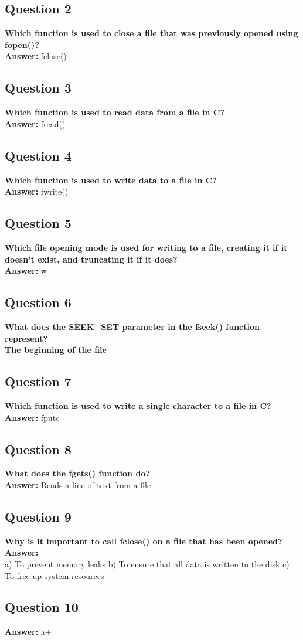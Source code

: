 \documentclass[11pt,parskip]{scrartcl}
\begin{document}
\subsection*{Question 2}
\textbf{Which function is used to close a file that was previously opened using fopen()?} \\
\textbf{Answer:} fclose()

\subsection*{Question 3}
\textbf{Which function is used to read data from a file in C?} \\
\textbf{Answer:} fread()

\subsection*{Question 4}
\textbf{Which function is used to write data to a file in C?} \\
\textbf{Answer:} fwrite()

\subsection*{Question 5}
\textbf{Which file opening mode is used for writing to a file, creating it if it doesn't exist, and truncating it if it does?} \\
\textbf{Answer:} w

\subsection*{Question 6}
\textbf{What does the SEEK\_SET parameter in the fseek() function represent?} \\
\textbf{The beginning of the file}

\subsection*{Question 7}
\textbf{Which function is used to write a single character to a file in C?} \\
\textbf{Answer:} fputc

\subsection*{Question 8}
\textbf{What does the fgets() function do?} \\
\textbf{Answer:} Reads a line of text from a file

\subsection*{Question 9}
\textbf{Why is it important to call fclose() on a file that has been opened?} \\
\textbf{Answer:} \\
a) To prevent memory leaks
b) To ensure that all data is written to the disk
c) To free up system resources

\subsection*{Question 10}
\textbf{Answer:} a+
\end{document}
